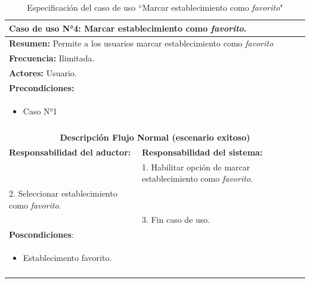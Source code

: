 \begin{table}[H]
    \centering
    \caption{Especificaci\'on del caso de uso ``Marcar establecimiento como \textit{favorito}"}
    \begin{tabularx}{\textwidth}{|X|X|}
        \hline
        \multicolumn{2}{|l|}{\textbf{Caso de uso N°4:} Marcar establecimiento como \textit{favorito}.}\\\hline
        \multicolumn{2}{|l|}{\textbf{Resumen:} Permite a los usuarios marcar establecimiento como \textit{favorito}}\\\hline
        \multicolumn{2}{|l|}{\textbf{Frecuencia:} Ilimitada.}\\\hline
        \multicolumn{2}{|l|}{\textbf{Actores:} Usuario.}\\\hline
        \multicolumn{2}{|l|}{\textbf{Precondiciones:}}\\
        \multicolumn{2}{|l|}{\begin{minipage}[t]{0.8\textwidth}
        \begin{itemize}
            \item Caso N°1
        \end{itemize}
        \end{minipage}}\\
        \multicolumn{2}{|l|}{}\\\hline
        \multicolumn{2}{|c|}{\textbf{Descripci\'on Flujo Normal (escenario exitoso)}}\\\hline
        \textbf{Responsabilidad del aductor:} & \textbf{Responsabilidad del sistema:}\\ \hline
        &1. Habilitar opción de marcar establecimiento como \textit{favorito}.\\
        2. Seleccionar establecimiento como \textit{favorito}.&\\
        &3. Fin caso de uso.\\\hline
        \multicolumn{2}{|l|}{\textbf{Poscondiciones}:}\\
        \multicolumn{2}{|l|}{\begin{minipage}[t]{0,4\textwidth}
        \begin{itemize}
            \item Establecimento favorito.
        \end{itemize}
        \end{minipage}}\\
        \multicolumn{2}{|l|}{}\\\hline        
    \end{tabularx}
    \label{usecase4}
\end{table}

